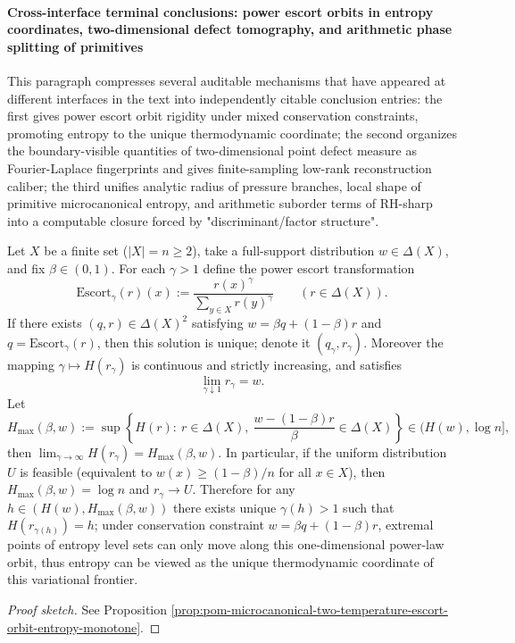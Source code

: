 
\paragraph{Cross-interface terminal conclusions: power escort orbits in entropy coordinates, two-dimensional defect tomography, and arithmetic phase splitting of primitives}
This paragraph compresses several auditable mechanisms that have appeared at different interfaces in the text into independently citable conclusion entries:
the first gives power escort orbit rigidity under mixed conservation constraints, promoting entropy to the unique thermodynamic coordinate;
the second organizes the boundary-visible quantities of two-dimensional point defect measure as Fourier-Laplace fingerprints and gives finite-sampling low-rank reconstruction caliber;
the third unifies analytic radius of pressure branches, local shape of primitive microcanonical entropy, and arithmetic suborder terms of RH-sharp into a computable closure forced by "discriminant/factor structure".

\begin{conclusion}\label{con:xi-terminal-escort-entropy-thermo-coordinate}
Let \(X\) be a finite set (\(|X|=n\ge 2\)), take a full-support distribution \(w\in\Delta(X)\), and fix \(\beta\in(0,1)\).
For each \(\gamma>1\) define the power escort transformation
\[
\mathrm{Escort}_\gamma(r)(x):=\frac{r(x)^\gamma}{\sum_{y\in X}r(y)^\gamma}\qquad(r\in\Delta(X)).
\]
If there exists \((q,r)\in\Delta(X)^2\) satisfying \(w=\beta q+(1-\beta)r\) and \(q=\mathrm{Escort}_\gamma(r)\), then this solution is unique; denote it \((q_\gamma,r_\gamma)\).
Moreover the mapping \(\gamma\mapsto H(r_\gamma)\) is continuous and strictly increasing, and satisfies
\[
\lim_{\gamma\downarrow 1}r_\gamma=w.
\]
Let
\[
H_{\max}(\beta,w):=\sup\left\{H(r):\ r\in\Delta(X),\ \frac{w-(1-\beta)r}{\beta}\in\Delta(X)\right\}\in(H(w),\log n],
\]
then \(\lim_{\gamma\to\infty}H(r_\gamma)=H_{\max}(\beta,w)\).
In particular, if the uniform distribution \(U\) is feasible (equivalent to \(w(x)\ge (1-\beta)/n\) for all \(x\in X\)), then \(H_{\max}(\beta,w)=\log n\) and \(r_\gamma\to U\).
Therefore for any \(h\in(H(w),H_{\max}(\beta,w))\) there exists unique \(\gamma(h)>1\) such that \(H(r_{\gamma(h)})=h\);
under conservation constraint \(w=\beta q+(1-\beta)r\), extremal points of entropy level sets can only move along this one-dimensional power-law orbit, thus entropy can be viewed as the unique thermodynamic coordinate of this variational frontier.
\end{conclusion}
\begin{proof}[Proof sketch]
See Proposition \ref{prop:pom-microcanonical-two-temperature-escort-orbit-entropy-monotone}.
\end{proof}

